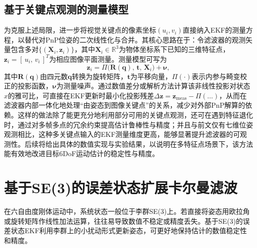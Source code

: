 \subsection{基于关键点观测的测量模型}
\label{sec:keypoints_in_ekf}

为克服上述局限，进一步将视觉关键点的像素坐标$(u_i, v_i)$直接纳入EKF的测量方程，以替代对PnP位姿的二次线性化与合并。其核心思路在于：令滤波器的观测矢量包含多对$\{(\mathbf{X}_i, \mathbf{z}_i)\}$，其中$\mathbf{X}_i\in\mathbb{R}^3$为物体坐标系下已知的三维特征点，$\mathbf{z}_i=[\,u_i,\,v_i\,]^T$为相应图像平面测量。测量模型可写为
\begin{equation}
	\mathbf{z}_i = \Pi\bigl(\mathbf{R}(\mathbf{q}),\,\mathbf{t},\,\mathbf{X}_i\bigr) + \boldsymbol{\nu},
\end{equation}
其中$\mathbf{R}(\mathbf{q})$由四元数$\mathbf{q}$转换为旋转矩阵，$\mathbf{t}$为平移向量，$\Pi(\cdot)$表示内参与畸变校正的投影函数，$\boldsymbol{\nu}$为测量噪声。通过数值差分或解析方法计算该非线性投影对状态$x$的雅可比，可直接在EKF更新时最小化投影残差$\Delta \mathbf{z} = \mathbf{z}_\text{meas}-\Pi(\dots)$，从而在滤波器内部一体化地处理“由姿态到图像关键点”的关系，减少对外部PnP解算的依赖。这样的做法除了能更充分地利用部分可用的关键点观测，还可在遇到特征退化时，通过对多帧多点的冗余约束提高估计鲁棒性与精度；并且与前文仅有七维位姿观测相比，这种多关键点输入的EKF测量维度更高，能够显著提升滤波器的可观测性。后续将给出具体的数值实现与实验结果，以说明在多特征点场景下，该方法能有效地改进目标6DoF运动估计的稳定性与精度。





\section{基于SE(3)的误差状态扩展卡尔曼滤波}
在六自由度刚体运动中，系统状态一般位于李群SE(3)上。若直接将姿态用欧拉角或旋转矩阵作线性加法运算，往往易导致数值不稳定或精度丢失。基于SE(3)的误差状态EKF利用李群上的小扰动形式更新姿态，可更好地保持估计的数值稳定性和精度。

